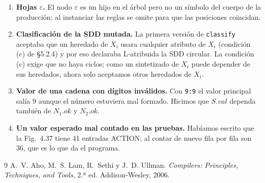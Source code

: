 \documentclass[11pt,a4paper]{article}
\newcommand{\eps}{\varepsilon}
\newcommand{\code}[1]{\texttt{#1}}
\begin{document}
\begin{enumerate}
\item \textbf{Hojas $\eps$.} El nodo $\eps$ es un hijo en el árbol pero no un símbolo del cuerpo
de la producción; al instanciar las reglas se omite para que las posiciones coincidan.
\item \textbf{Clasificación de la SDD mutada.} La primera versión de \code{classify} aceptaba que
un heredado de $X_i$ usara cualquier atributo de $X_i$ (condición (c) de §5.2.4) y por eso
declaraba L-atribuida la SDD circular. La condición (c) exige que no haya ciclos; como un
sintetizado de $X_i$ puede depender de sus heredados, ahora solo aceptamos otros heredados de
$X_i$.
\item \textbf{Valor de una cadena con dígitos inválidos.} Con \code{9:9} el valor principal
salía 9 aunque el número estuviera mal formado. Hicimos que $S.val$ dependa también de $N_1.ok$
y $N_2.ok$.
\item \textbf{Un valor esperado mal contado en las pruebas.} Habíamos escrito que la Fig.~4.37
tiene 41 entradas ACTION; al contar de nuevo fila por fila son 36, que es lo que da el programa.
\end{enumerate}

\begin{thebibliography}{9}
 A.~V. Aho, M.~S. Lam, R.~Sethi y J.~D. Ullman. \emph{Compilers: Principles,
Techniques, and Tools}, 2.ª ed. Addison-Wesley, 2006.
\end{thebibliography}
\end{document}
